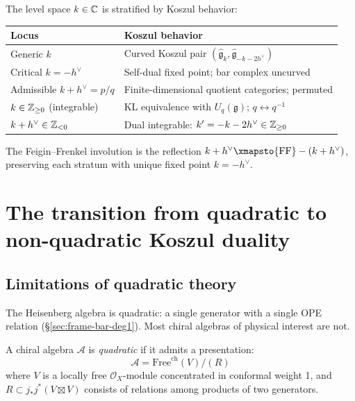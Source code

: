\begin{remark}\label{rem:critical-locus}
The level space $k \in \mathbb{C}$ is stratified by Koszul behavior:
\begin{center}
\begin{tabular}{ll}
\textbf{Locus} & \textbf{Koszul behavior} \\
\hline
Generic $k$ & Curved Koszul pair $(\widehat{\mathfrak{g}}_k, \widehat{\mathfrak{g}}_{-k-2h^\vee})$ \\
Critical $k = -h^\vee$ & Self-dual fixed point; bar complex uncurved \\
Admissible $k + h^\vee = p/q$ & Finite-dimensional quotient categories; permuted \\
$k \in \mathbb{Z}_{\geq 0}$ (integrable) & KL equivalence with $U_q(\mathfrak{g})$; $q \leftrightarrow q^{-1}$ \\
$k + h^\vee \in \mathbb{Z}_{<0}$ & Dual integrable: $k' = -k-2h^\vee \in \mathbb{Z}_{\geq 0}$
\end{tabular}
\end{center}
The Feigin--Frenkel involution is the reflection $k + h^\vee \xmapsto{\mathrm{FF}} -(k + h^\vee)$, preserving each stratum with unique fixed point $k = -h^\vee$.
\end{remark}


\section{The transition from quadratic to non-quadratic Koszul duality}

\subsection{Limitations of quadratic theory}

The Heisenberg algebra is quadratic: a single generator with a single OPE relation (\S\ref{sec:frame-bar-deg1}).  Most chiral algebras of physical interest are not.

\begin{definition}
A chiral algebra $\mathcal{A}$ is \emph{quadratic} if it admits a presentation:
\[
\mathcal{A} = \text{Free}^{\text{ch}}(V)/(R)
\]
where $V$ is a locally free $\mathcal{O}_X$-module concentrated in conformal weight 1, and $R \subset j_*j^*(V \boxtimes V)$ consists of relations among products of two generators.
\end{definition}

